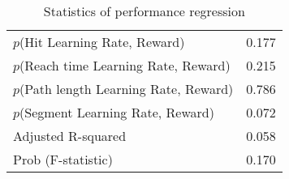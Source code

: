 \documentclass[../main.tex]{subfiles}
\begin{document}
\begin{table}[H]
    \begin{center}
        \caption[Statistics of performance regression]{Statistics of performance regression}\label{tab:performance_stats}
        \begin{tabular}{l | c}
            \hline
            $p$(Hit Learning Rate, Reward) & 0.177 \\
            $p$(Reach time Learning Rate, Reward) & 0.215 \\
            $p$(Path length Learning Rate, Reward) & 0.786 \\
            $p$(Segment Learning Rate, Reward) & 0.072 \\
            Adjusted R-squared & 0.058 \\
            Prob (F-statistic) & 0.170
        \end{tabular}
    \end{center}
  \end{table}
  

\end{document}
